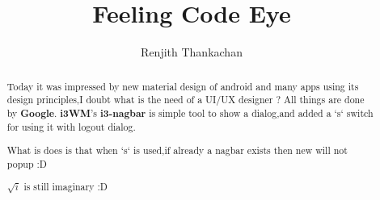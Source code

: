 \documentclass[]{article}
\begin{document}
\title{Feeling Code Eye}
\author{Renjith Thankachan}
\maketitle

\begin{abstract}
Today it was impressed by new material design of android and many apps using its design principles,I doubt what is the need of a UI/UX designer ? All things are done by \textbf{Google}.
\textbf{i3WM}'s \textbf{i3-nagbar} is simple tool to show a dialog,and added a `s` switch for using it with logout dialog.

What is does is that when `s` is used,if already a nagbar exists then new will not popup :D 


$\sqrt{i}$ is still imaginary :D
\end{abstract}
\end{document}
